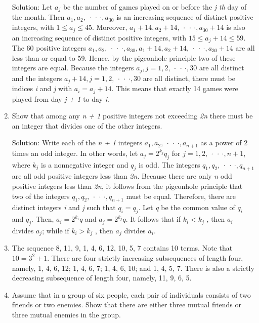 \documentclass[11pt,a4paper]{book}
\begin{document}
\begin{enumerate}[label=Example~\arabic*]
Solution: Let $a_j$ be the number of games played on or before the \emph{j th} day of the month.
Then $a_1, a_2,~\cdot~\cdot~\cdot, a_{30}$ is an increasing sequence of distinct positive integers, with $1 \leq a_j \leq 45$.
Moreover, $a_1 + 14, a_2 + 14,~\cdot~\cdot~\cdot, a_{30} + 14$ is also an increasing sequence of distinct positive integers, with $15 \leq a_j + 14 \leq 59$.
The 60 positive integers $a_1, a_2,~\cdot~\cdot~\cdot, a_{30}, a_1 + 14, a_2 + 14,~\cdot~\cdot~\cdot, a_{30} + 14$ are all less than or equal to 59.
Hence, by the pigeonhole principle two of these integers are equal.
Because the integers $a_j , j = 1, 2,~\cdot~\cdot~\cdot, 30$ are all distinct and the integers $a_j + 14, j = 1, 2,~\cdot~\cdot~\cdot, 30$ are all distinct, there must be indices \emph{i} and \emph{j} with $a_i = a_j + 14$.
This means that exactly 14 games were played from day \emph{j + 1} to day \emph{i}.

\item Show that among any \emph{n + 1} positive integers not exceeding \emph{2n} there must be an integer that divides one of the other integers.

Solution: Write each of the \emph{n + 1} integers $a_1, a_2,~\cdot~\cdot~\cdot, a_{n+1}$ as a power of 2 times an odd integer.
In other words, let $a_j = 2^{k_j}q_j$ for $j = 1, 2,~\cdot~\cdot~\cdot, n + 1$, where $k_j$ is a nonnegative integer and $q_j$ is odd.
The integers $q_1, q_2,~\cdot~\cdot~\cdot, q_{n+1}$ are all odd positive integers less than \emph{2n}.
Because there are only \emph{n} odd positive integers less than \emph{2n}, it follows from the pigeonhole principle that two of the integers $q_1, q_2,~\cdot~\cdot~\cdot, q_{n+1}$ must be equal.
Therefore, there are distinct integers \emph{i} and \emph{j} such that $q_i = q_j$.
Let \emph{q }be the common value of $q_i$ and $q_j$.
Then, $a_i = 2^{k_i}q$ and $a_j = 2^{k_j}q$.
It follows that if $k_i < k_j$ , then $a_i$ divides $a_j$; while if $k_i > k_j$ , then $a_j$ divides $a_i$.

\item The sequence 8, 11, 9, 1, 4, 6, 12, 10, 5, 7 contains 10 terms.
Note that $10 = 3^{2} + 1$.
There are four strictly increasing subsequences of length four, namely, 1, 4, 6, 12; 1, 4, 6, 7;
1, 4, 6, 10; and 1, 4, 5, 7. There is also a strictly decreasing subsequence of length four, namely, 11, 9, 6, 5.

\item Assume that in a group of six people, each pair of individuals consists of two friends or two enemies.
Show that there are either three mutual friends or three mutual enemies in the group.


\end{enumerate}
\end{document}
